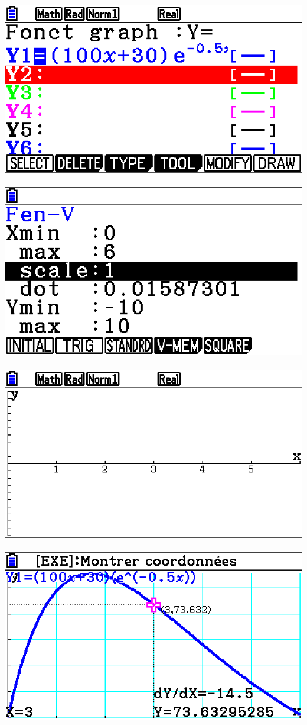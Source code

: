 \documentclass[a4paper,11pt]{article}
\begin{document}
\begin{center}
	\includegraphics[height=\htimg]{tp01_corr_situ3_a}~~\includegraphics[height=\htimg]{tp01_corr_situ3_b}~~\includegraphics[height=\htimg]{tp01_corr_situ3_c}~~\includegraphics[height=\htimg]{tp01_corr_situ3_d}
\end{center}
\end{document}
